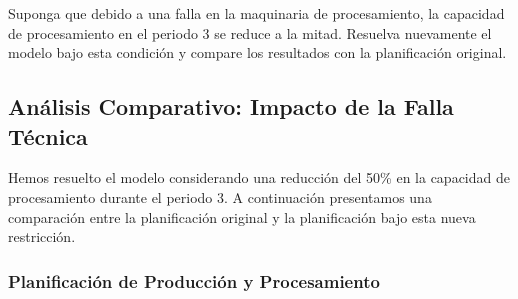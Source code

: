 \label{q:pregunta3}

Suponga que debido a una falla en la maquinaria de procesamiento, la capacidad de procesamiento en el periodo 3 se reduce a la mitad. Resuelva nuevamente el modelo bajo esta condición y compare los resultados con la planificación original.

\answer

\subsection*{Análisis Comparativo: Impacto de la Falla Técnica}

Hemos resuelto el modelo considerando una reducción del 50\% en la capacidad de procesamiento durante el periodo 3. A continuación presentamos una comparación entre la planificación original y la planificación bajo esta nueva restricción.

\subsubsection*{Planificación de Producción y Procesamiento}

\begin{table}[H]
    \centering
    \caption{Comparación de producción y satisfacción de demanda entre escenario base y falla}
    \label{tab:comparativa_produccion}
\end{table}

